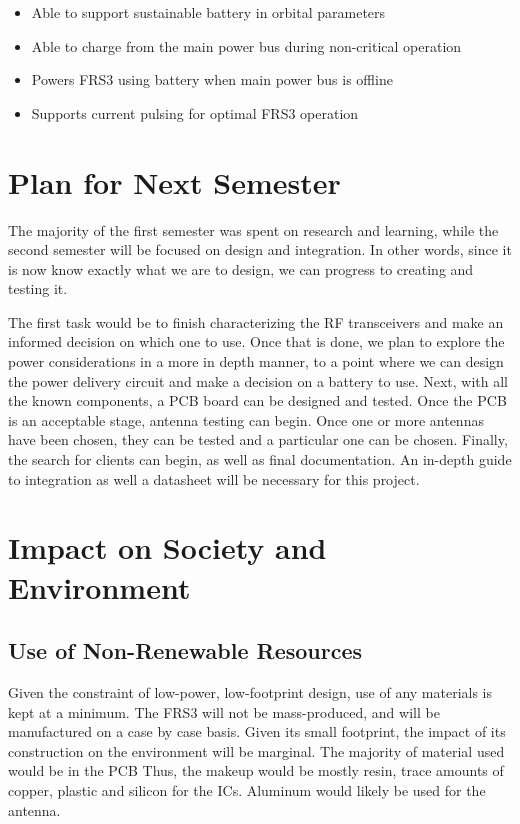 \documentclass[12pt, twoside]{report}
\begin{document}
\begin{itemize}[noitemsep]
\label{Power_Delivery_Requirements}
\item Able to support sustainable battery in orbital parameters
\item Able to charge from the main power bus during non-critical operation
\item Powers FRS3 using battery when main power bus is offline
\item Supports current pulsing for optimal FRS3 operation
\end{itemize}

\chapter{Plan for Next Semester}
\par The majority of the first semester was spent on research and learning, while the second semester will be focused on design and integration. In other words, since it is now know exactly what we are to design, we can progress to creating and testing it.
\par The first task would be to finish characterizing the RF transceivers and make an informed decision on which one to use. Once that is done, we plan to explore the power considerations in a more in depth manner, to a point where we can design the power delivery circuit and make a decision on a battery to use. Next, with all the known components, a PCB board can be designed and tested. Once the PCB is an acceptable stage, antenna testing can begin. Once one or more antennas have been chosen, they can be tested and a particular one can be chosen. Finally, the search for clients can begin, as well as final documentation. An in-depth guide to integration as well a datasheet will be necessary for this project.

\chapter{Impact on Society and Environment}
\section{Use of Non-Renewable Resources}
\par Given the constraint of low-power, low-footprint design, use of any materials is kept at a minimum.
The FRS3 will not be mass-produced, and will be manufactured on a case by case basis.
Given its small footprint, the impact of its construction on the environment will be marginal.
The majority of material used would be in the PCB\@
Thus, the makeup would be mostly resin, trace amounts of copper, plastic and silicon for the ICs.
Aluminum would likely be used for the antenna.
\end{document}
